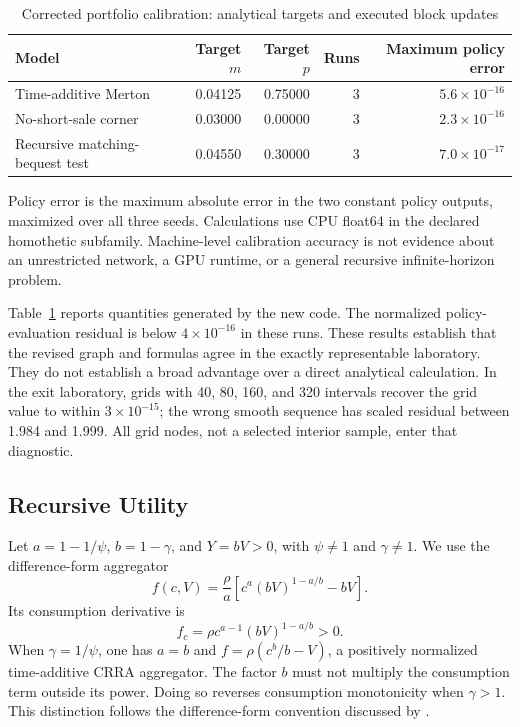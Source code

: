 \begin{table}[t]
\centering
\caption{Corrected portfolio calibration: analytical targets and executed block updates}\label{tab:portfolio}
\begin{tabular}{lrrrr}
\toprule
Model & Target $m$ & Target $p$ & Runs & Maximum policy error\\
\midrule
Time-additive Merton & 0.04125 & 0.75000 & 3 & $5.6\times10^{-16}$\\
No-short-sale corner & 0.03000 & 0.00000 & 3 & $2.3\times10^{-16}$\\
Recursive matching-bequest test & 0.04550 & 0.30000 & 3 & $7.0\times10^{-17}$\\
\bottomrule
\end{tabular}
\par\smallskip\footnotesize Policy error is the maximum absolute error in the two constant policy outputs, maximized over all three seeds. Calculations use CPU float64 in the declared homothetic subfamily. Machine-level calibration accuracy is not evidence about an unrestricted network, a GPU runtime, or a general recursive infinite-horizon problem.
\end{table}

Table~\ref{tab:portfolio} reports quantities generated by the new code. The normalized policy-evaluation residual is below $4\times10^{-16}$ in these runs. These results establish that the revised graph and formulas agree in the exactly representable laboratory. They do not establish a broad advantage over a direct analytical calculation. In the exit laboratory, grids with 40, 80, 160, and 320 intervals recover the grid value to within $3\times10^{-15}$; the wrong smooth sequence has scaled residual between 1.984 and 1.999. All grid nodes, not a selected interior sample, enter that diagnostic.

\subsection{Recursive Utility}\label{sec:recursive}
Let $a=1-1/\psi$, $b=1-\gamma$, and $Y=bV>0$, with $\psi\ne1$ and $\gamma\ne1$. We use the difference-form aggregator
\begin{equation}\label{eq:ez}
 f(c,V)=\frac\rho a\left[c^a(bV)^{1-a/b}-bV\right].
\end{equation}
Its consumption derivative is
\begin{equation}\label{eq:ezderivative}
 f_c=\rho c^{a-1}(bV)^{1-a/b}>0.
\end{equation}
When $\gamma=1/\psi$, one has $a=b$ and $f=\rho(c^b/b-V)$, a positively normalized time-additive CRRA aggregator. The factor $b$ must not multiply the consumption term outside its power. Doing so reverses consumption monotonicity when $\gamma>1$. This distinction follows the difference-form convention discussed by \citet{herdegen2021}.

